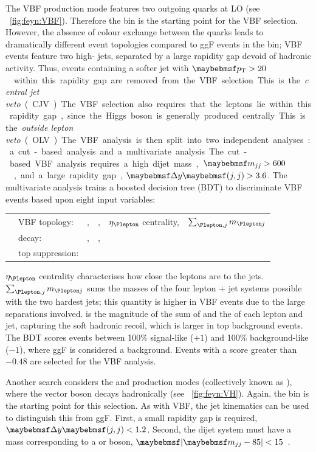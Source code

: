 The VBF production mode features two outgoing quarks at LO (see \Figure~\ref{fig:feyn:VBF}). 
Therefore the \twojet bin is the starting point for the VBF selection. However, the 
absence of colour exchange between the quarks leads to dramatically different event 
topologies compared to ggF events in the \twojet bin; VBF events feature two high-\pt 
jets, separated by a large rapidity gap devoid of hadronic activity. Thus, events 
containing a softer jet with \unit{$\pt > 20$}{\GeV} within this rapidity gap are removed 
from the VBF selection. This is the \textit{central jet veto} (CJV). The VBF selection 
also requires that the leptons lie within this rapidity gap, since the Higgs boson is 
generally produced centrally. This is the \textit{outside lepton veto} (OLV). 

The VBF analysis is then split into two independent analyses: a cut-based analysis and a 
multivariate analysis. The cut-based VBF analysis requires a high dijet mass, 
\unit{$\mjj > 600$}{\GeV}, and a large rapidity gap, $\dyjj > 3.6$. The multivariate 
analysis trains a boosted decision tree (BDT) \cite{TMVA} to discriminate VBF events based 
upon eight input variables:

\begin{listliketab}
	\begin{tabular}{Ll@{\hskip 0.3in}llll}
		\textbullet & VBF topology:    & \mjj, &\dyjj, &$\eta_{\Plepton}$ centrality, &$\sum_{\Plepton, j} m_{\Plepton j}$ \\
		\textbullet & \HWW decay:      & \mll, &\dphill, &\mt \\
		\textbullet & top suppression: & \pttot \\
	\end{tabular}
\end{listliketab}

\noindent
$\eta_{\Plepton}$ centrality characterises how close the leptons are to the jets. 
$\sum_{\Plepton, j} m_{\Plepton j}$ sums the masses of the four lepton + jet systems 
possible with the two hardest jets; this quantity is higher in VBF events due to the large 
separations involved. \pttot is the magnitude of the sum of \corrtrackmetvec and the \ptvec 
of each lepton and jet, capturing the soft hadronic recoil, which is larger in top 
background events. The BDT scores events between 100\% signal-like ($+1$) and 100\% 
background-like ($-1$), where ggF is considered a background. Events with a score greater 
than $-0.48$ are selected for the VBF analysis.

Another search considers the \WH and \ZH production modes (collectively known as \VH), 
where the vector boson decays hadronically (see \Figure~\ref{fig:feyn:VH}). Again, the 
\twojet bin is the starting point for this selection. As with VBF, the jet kinematics can 
be used to distinguish this from ggF. First, a small rapidity gap is required, $\dyjj < 1.2$.
Second, the dijet system must have a mass corresponding to a \PW or \PZ boson, 
\unit{$\mods{\mjj - 85} < 15$}{\GeV}.

